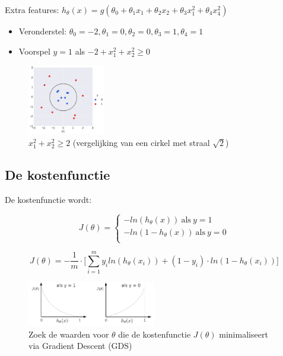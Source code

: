 \documentclass{article}
\begin{document}
Extra features: $h_{\theta}(x) = g(\theta_0 + \theta_1x_1 + \theta_2x_2 + \theta_3x_1^2 + \theta_4x_4^2)$

\begin{itemize}
    \item Veronderstel: $\theta_0 = -2, \theta_1 = 0, \theta_2 = 0, \theta_3 = 1, \theta_4 = 1$
    \item Voorspel $y=1$ als $-2 + x_1^2 + x_2^2 \geq 0$
\end{itemize}

\begin{figure}[H]
    \centering
    \includegraphics[width=0.3\textwidth]{logistic-circle2.png}
    \caption{$x_1^2 + x_2^2 \geq 2$ (vergelijking van een cirkel met straal $\sqrt{2}$)}
\end{figure}

\subsection{De kostenfunctie}

De kostenfunctie wordt:

\begin{equation}
J(\theta) = \left\{
    \begin{array}{ll}
        -ln(h_\theta(x))\ \text{als}\ y = 1\\
        -ln(1 - h_\theta(x))\ \text{als}\ y = 0\\
    \end{array}
\right.
\end{equation}

\begin{equation}
J(\theta) = -\frac{1}{m} \cdot \Bigg[ \sum_{i=1}^m y_i ln(h_{\theta}(x_i)) + (1 - y_i) \cdot ln(1 - h_{\theta}(x_i)) \Bigg]
\end{equation}

\begin{figure}[H]
    \centering
    \includegraphics[width=0.5\textwidth]{logistic-kostenfunctie.png}
    \caption{Zoek de waarden voor $\theta$ die de kostenfunctie $J(\theta)$ minimaliseert via Gradient Descent (GDS)}
\end{figure}
\end{document}

